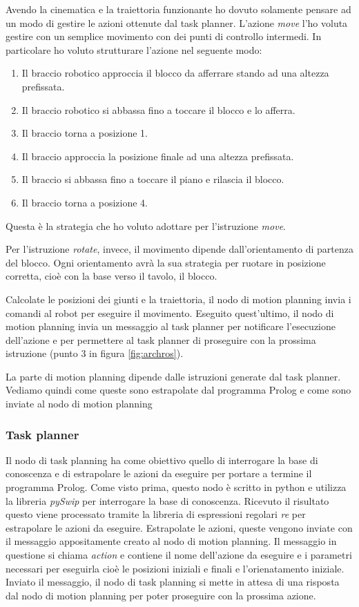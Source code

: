 Avendo la cinematica e la traiettoria funzionante ho dovuto solamente pensare ad un modo di gestire le azioni ottenute dal task planner. L'azione \textit{move} l'ho voluta gestire con un semplice movimento con dei punti di controllo intermedi. In particolare ho voluto strutturare l'azione nel seguente modo:
\begin{enumerate}
    \item Il braccio robotico approccia il blocco da afferrare stando ad una altezza prefissata.
    \item Il braccio robotico si abbassa fino a toccare il blocco e lo afferra.
    \item Il braccio torna a posizione 1.
    \item Il braccio approccia la posizione finale ad una altezza prefissata.
    \item Il braccio si abbassa fino a toccare il piano e rilascia il blocco.
    \item Il braccio torna a posizione 4.
\end{enumerate}
Questa è la strategia che ho voluto adottare per l'istruzione \textit{move}.

Per l'istruzione \textit{rotate}, invece, il movimento dipende dall'orientamento di partenza del blocco. 
Ogni orientamento avrà la sua strategia per ruotare in posizione corretta, cioè con la base verso il tavolo, il blocco.

Calcolate le posizioni dei giunti e la traiettoria, il nodo di motion planning invia i comandi al robot per eseguire il movimento.
Eseguito quest'ultimo, il nodo di motion planning invia un messaggio al task planner per notificare l'esecuzione dell'azione e per permettere al task planner di proseguire con la prossima istruzione (punto 3 in figura \ref{fig:archros}).

La parte di motion planning dipende dalle istruzioni generate dal task planner. Vediamo quindi come queste sono estrapolate dal programma Prolog e come sono inviate al nodo di motion planning
\subsubsection{Task planner}
\label{subsubsec:taskplanner}
Il nodo di task planning ha come obiettivo quello di interrogare la base di conoscenza e di estrapolare le azioni da eseguire per portare a termine il programma Prolog.
Come visto prima, questo nodo è scritto in python e utilizza la libreria \textit{pySwip} per interrogare la base di conoscenza. 
Ricevuto il risultato questo viene processato tramite la libreria di espressioni regolari \textit{re} per estrapolare le azioni da eseguire. 
Estrapolate le azioni, queste vengono inviate con il messaggio appositamente creato al nodo di motion planning. Il messaggio in questione si chiama \textit{action} e contiene il nome dell'azione da eseguire e i parametri necessari per eseguirla cioè le posizioni iniziali e finali e l'orienatamento iniziale.
Inviato il messaggio, il nodo di task planning si mette in attesa di una risposta dal nodo di motion planning per poter proseguire con la prossima azione.

